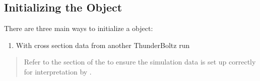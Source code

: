 \documentclass[letterpaper,10pt,english,openany,oneside]{sphinxmanual}
\begin{document}
\subsection{Initializing the  Object}
\label{\detokenize{cs_guide:initializing-the-crosssections-object}}
\sphinxAtStartPar
There are three main ways to initialize a {\hyperref[\detokenize{api/pytb.CrossSections:pytb.CrossSections}]{}} object:
\begin{enumerate}
%
\item {} 
\sphinxAtStartPar
With cross section data from another ThunderBoltz run

\begin{sphinxVerbatim}[commandchars=\\\{\}]
   
  
\end{sphinxVerbatim}

\end{enumerate}
\begin{quote}

\sphinxAtStartPar
Refer to the {\hyperref[\detokenize{api/pytb.CrossSections:pytb.CrossSections}]{}} section of the {\hyperref[\detokenize{ref::doc}]{}} to ensure the
simulation data is set up correctly for interpretation by {\hyperref[\detokenize{api/pytb.CrossSections:pytb.CrossSections}]{}}.
\end{quote}
\end{document}
